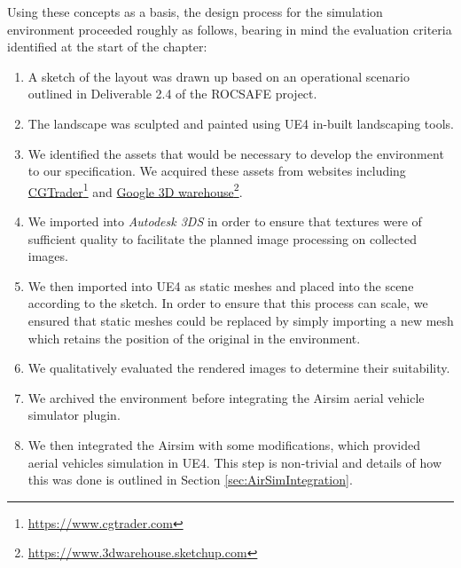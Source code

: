 Using these concepts as a basis, the design process for the simulation environment proceeded roughly as follows, bearing in mind the evaluation criteria identified at the start of the chapter:
\begin{enumerate}
    \item A sketch of the layout was drawn up based on an operational scenario outlined in Deliverable 2.4 of the ROCSAFE project.
    \item The landscape was sculpted and painted using UE4 in-built landscaping tools.
    \item We identified the assets that would be necessary to develop the environment to our specification. We acquired these assets from websites including 
\href{http://www.cgtrader.com}{CGTrader}\footnote{\href {http://www.cgtrader.com}{https://www.cgtrader.com}}
and 
\href{https://3dwarehouse.sketchup.com/?hl=en}{Google 3D warehouse}\footnote{\href {https://3dwarehouse.sketchup.com/?hl=en}{https://www.3dwarehouse.sketchup.com}}.
\item We imported into \emph{Autodesk 3DS} in order to ensure that textures were of sufficient quality to facilitate the planned image processing on collected images.
\item We then imported into UE4 as static meshes and placed into the scene according to the sketch. In order to ensure that this process can scale, we ensured that static meshes could be replaced by simply importing a new mesh which retains the position of the original in the environment. 
\item We qualitatively evaluated the rendered images to determine their suitability.
\item We archived the environment before integrating the Airsim aerial vehicle simulator plugin.
\item We then integrated the Airsim \cite{Shah2017AirSim:Vehicles} with some modifications, which provided aerial vehicles simulation in UE4. This step is non-trivial and details of how this was done is outlined in Section \ref{sec:AirSimIntegration}.
\end{enumerate} 


